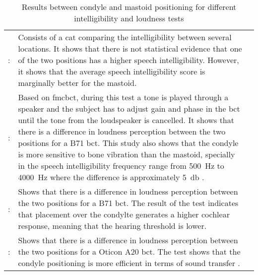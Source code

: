  
\begin{table}[H]
\caption{Results between condyle and mastoid positioning for different intelligibility and loudness tests} 
\begin{tabularx}{\textwidth}{l X l}
\hline
\citep{cat_test}: & Consists of a \gls{cat} comparing the intelligibility between several locations. It shows that there is not statistical evidence that one of the two positions has a higher speech intelligibility. However, it shows that the average speech intelligibility score is marginally better for the mastoid. \\
\citep{freefield_method}: & Based on \gls{fmcbct}, during this test a tone is played through a speaker and the subject has to adjust gain and phase in the \gls{bct} until the tone from the loudspeaker is cancelled. It shows that there is a difference in loudness perception between the two positions for a B71 \gls{bct}. This study also shows that the condyle is more sensitive to bone vibration than the mastoid, specially in the speech intelligibility frequency range from \SI{500}{\hertz} to \SI{4000}{\hertz} where the difference is approximately \SI{5}{\decibel} \citep{freefield_method}. \\
\citep{Influence_without}: & Shows that there is a difference in loudness perception between the two positions for a B71 \gls{bct}. The result of the test indicates that placement over the condylte generates a higher cochlear response, meaning that the hearing threshold is lower.\\
\citep{sensitivity_mapping}: & Shows that there is a difference in loudness perception between the two positions for a Oticon A20 \gls{bct}. The test shows that the condyle positioning is more efficient  in terms of sound transfer . \\ \hline
\end{tabularx}
\label{tab:test_methoed}
\end{table}



